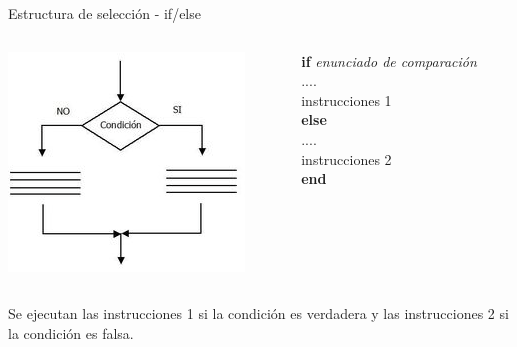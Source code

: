 \documentclass{bredelebeamer}
\begin{document}
\begin{frame}{Estructura de selección - if/else}
\begin{columns}
\begin{column}{0.5\textwidth}
\begin{center}
\includegraphics[scale=0.5]{images/pantalla4.png}
\end{center}
\end{column}
\begin{column}{0.3\textwidth}
\textbf{if} \textit{enunciado de comparación}\\
	....\\
    instrucciones 1\\
\textbf{else}\\
 	....\\
    instrucciones 2\\
\textbf{end}
\end{column}
\end{columns}
\begin{center}
Se ejecutan las instrucciones 1 si la condición es verdadera y las instrucciones 2 si la condición es falsa. 
\end{center}
\end{frame}
\end{document}
